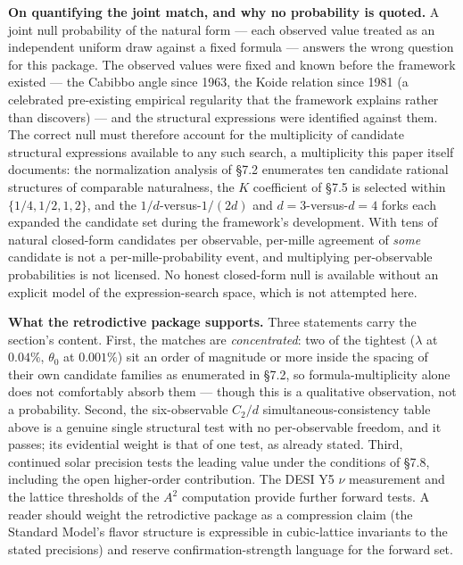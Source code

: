 \documentclass[
]{article}
\begin{document}
\textbf{On quantifying the joint match, and why no probability is
quoted.} A joint null probability of the natural form --- each observed
value treated as an independent uniform draw against a fixed formula ---
answers the wrong question for this package. The observed values were
fixed and known before the framework existed --- the Cabibbo angle since
1963, the Koide relation since 1981 (a celebrated pre-existing empirical
regularity that the framework explains rather than discovers) --- and
the structural expressions were identified against them. The correct
null must therefore account for the multiplicity of candidate structural
expressions available to any such search, a multiplicity this paper
itself documents: the normalization analysis of §7.2 enumerates ten
candidate rational structures of comparable naturalness, the \(K\)
coefficient of §7.5 is selected within \(\{1/4, 1/2, 1, 2\}\), and the
\(1/d\)-versus-\(1/(2d)\) and \(d=3\)-versus-\(d=4\) forks each expanded
the candidate set during the framework's development. With tens of
natural closed-form candidates per observable, per-mille agreement of
\emph{some} candidate is not a per-mille-probability event, and
multiplying per-observable probabilities is not licensed. No honest
closed-form null is available without an explicit model of the
expression-search space, which is not attempted here.

\textbf{What the retrodictive package supports.} Three statements carry
the section's content. First, the matches are \emph{concentrated}: two
of the tightest (\(\lambda\) at \(0.04\%\), \(\theta_0\) at \(0.001\%\))
sit an order of magnitude or more inside the spacing of their own
candidate families as enumerated in §7.2, so formula-multiplicity alone
does not comfortably absorb them --- though this is a qualitative
observation, not a probability. Second, the six-observable \(C_2/d\)
simultaneous-consistency table above is a genuine single structural test
with no per-observable freedom, and it passes; its evidential weight is
that of one test, as already stated. Third, continued solar precision
tests the leading value under the conditions of §7.8, including the open
higher-order contribution. The DESI Y5 \(\nu\) measurement and the
lattice thresholds of the \(A^2\) computation provide further forward
tests. A reader should weight the retrodictive package as a compression
claim (the Standard Model's flavor structure is expressible in
cubic-lattice invariants to the stated precisions) and reserve
confirmation-strength language for the forward set.
\end{document}
